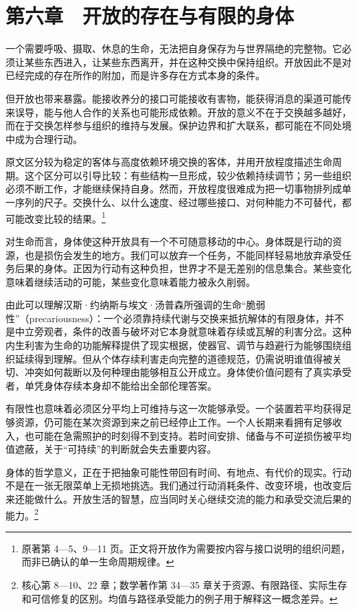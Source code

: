 \documentclass[
  11pt,
  oneside]{book}
\begin{document}
\chapter{第六章　开放的存在与有限的身体}\label{ph-ch-06}

一个需要呼吸、摄取、休息的生命，无法把自身保存为与世界隔绝的完整物。它必须让某些东西进入，让某些东西离开，并在这种交换中保持组织。开放因此不是对已经完成的存在所作的附加，而是许多存在方式本身的条件。

但开放也带来暴露。能接收养分的接口可能接收有害物，能获得消息的渠道可能传来误导，能与他人合作的关系也可能形成依赖。开放的意义不在于交换越多越好，而在于交换怎样参与组织的维持与发展。保护边界和扩大联系，都可能在不同处境中成为合理行动。

原文区分较为稳定的客体与高度依赖环境交换的客体，并用开放程度描述生命周期。这个区分可以引导比较：有些结构一旦形成，较少依赖持续调节；另一些组织必须不断工作，才能继续保持自身。然而，开放程度很难成为把一切事物排列成单一序列的尺子。交换什么、以什么速度、经过哪些接口、对何种能力不可替代，都可能改变比较的结果。\footnote{\hypertarget{ph-note-13}{}原著第 4---5、9---11 页。正文将开放作为需要按内容与接口说明的组织问题，而非已确认的单一生命周期规律。}

对生命而言，身体使这种开放具有一个不可随意移动的中心。身体既是行动的资源，也是损伤会发生的地方。我们可以放弃一个任务，不能同样轻易地放弃承受任务后果的身体。正因为行动有这种负担，世界才不是无差别的信息集合。某些变化意味着继续活动的可能，某些变化意味着能力被永久削弱。

由此可以理解汉斯·约纳斯与埃文·汤普森所强调的生命``脆弱性''（precariousness）：一个必须靠持续代谢与交换来抵抗解体的有限身体，并不是中立旁观者，条件的改善与破坏对它本身就意味着存续或瓦解的利害分岔。这种内生利害为生命的功能解释提供了现实根据，使器官、调节与趋避行为能够围绕组织延续得到理解。但从个体存续利害走向完整的道德规范，仍需说明谁值得被关切、冲突如何裁断以及何种理由能够相互公开成立。身体使价值问题有了真实承受者，单凭身体存续本身却不能给出全部伦理答案。

有限性也意味着必须区分平均上可维持与这一次能够承受。一个装置若平均获得足够资源，仍可能在某次资源到来之前已经停止工作。一个人长期来看拥有足够收入，也可能在急需照护的时刻得不到支持。若时间安排、储备与不可逆损伤被平均值遮蔽，关于``可持续''的判断就会失去重要内容。

\begingroup{}

身体的哲学意义，正在于把抽象可能性带回有时间、有地点、有代价的现实。行动不是在一张无限菜单上无损地挑选。我们通过行动消耗条件、改变环境，也改变后来还能做什么。开放生活的智慧，应当同时关心继续交流的能力和承受交流后果的能力。\footnote{\hypertarget{ph-note-14}{}核心第 8---10、22 章；数学著作第 34---35 章关于资源、有限路径、实际生存和可信修复的区别。均值与路径承受能力的例子用于解释这一概念差异。}
\end{document}
